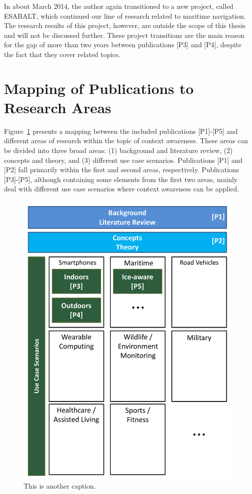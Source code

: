 In about March 2014, the author again transitioned to a new project, called ESABALT, which continued our line of research related to maritime navigation. The research results of this project, however, are outside the scope of this thesis and will not be discussed further. These project transitions are the main reason for the gap of more than two years between publications [P3] and [P4], despite the fact that they cover related topics.

\section{Mapping of Publications to Research Areas}
\label{sec:relating_to_research}

Figure~\ref{fig:publication-chart} presents a mapping between the included publications [P1]-[P5] and different areas of research within the topic of context awareness. These areas can be divided into three broad areas: (1) background and literature review, (2) concepts and theory, and (3) different use case scenarios. Publications [P1] and [P2] fall primarily within the first and second areas, respectively. Publications [P3]-[P5], although containing some elements from the first two areas, mainly deal with different use case scenarios where context awareness can be applied.

\begin{figure}
  \begin{center}
    \includegraphics[width=1.0\textwidth]{figChapter4}
  \end{center}
  \caption[Publication chart]{This is another caption.}
  \label{fig:publication-chart}
\end{figure}

